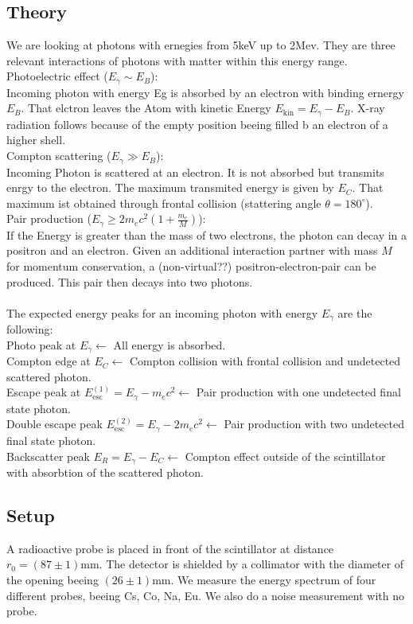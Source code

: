 \documentclass[a4paper,12pt]{article}
\begin{document}
\subsection{Theory}
We are looking at photons with ernegies from 5keV up to 2Mev. They are three relevant interactions of photons with matter within this energy range.\\
Photoelectric effect ($E_\gamma \sim E_B$):\\
Incoming photon with energy Eg is absorbed by an electron with binding ernergy $E_B$. That elctron leaves the Atom with kinetic Energy $E_{\mathrm{kin}} = E_\gamma - E_B$. X-ray radiation follows because of the empty position beeing filled b an electron of a higher shell.\\
Compton scattering ($E_\gamma \gg E_B$):\\
Incoming Photon is scattered at an electron. It is not absorbed but transmits enrgy to the electron. The maximum transmited energy is given by $E_C$. That maximum ist obtained through frontal collision (stattering angle $\theta = 180^\circ$).\\
Pair production ($E_\gamma \geqslant 2m_ec^2(1+\frac{m_e}{M})$):\\
If the Energy is greater than the mass of two electrons, the photon can decay in a positron and an electron. Given an additional interaction partner with mass $M$ for momentum conservation, a (non-virtual??) positron-electron-pair can be produced. This pair then decays into two photons.\\
\\
The expected energy peaks for an incoming photon with energy $E_\gamma$ are the following:\\
Photo peak at $E_\gamma \leftarrow$ All energy is absorbed.\\
Compton edge at $E_C \leftarrow$ Compton collision with frontal collision and undetected scattered photon.\\
Escape peak at $E_\mathrm{esc}^{(1)} = E_\gamma - m_ec^2 \leftarrow$ Pair production with one undetected final state photon.\\
Double escape peak $E_\mathrm{esc}^{(2)} = E_\gamma - 2m_ec^2 \leftarrow$ Pair production with two undetected final state photon.\\
Backscatter peak $E_R = E_\gamma - E_C \leftarrow$ Compton effect outside of the scintillator with absorbtion of the scattered photon.\\

\subsection{Setup}
A radioactive probe is placed in front of the scintillator at distance $r_0 = (87\pm1)$mm. The detector is shielded by a collimator with the diameter of the opening beeing $(26\pm1)$mm. We measure the energy spectrum of four different probes, beeing Cs, Co, Na, Eu. We also do a noise measurement with no probe.
  
\end{document}
